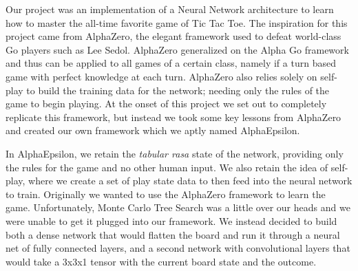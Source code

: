 

Our project was an implementation of a Neural Network architecture to learn how to master the all-time favorite game of Tic Tac Toe.
The inspiration for this project came from AlphaZero, the elegant framework used to defeat world-class Go players such as Lee Sedol.
AlphaZero generalized on the Alpha Go framework and thus can be applied to all games of a certain class, namely if a turn based game with perfect knowledge at each turn.
AlphaZero also relies solely on self-play to build the training data for the network;
needing only the rules of the game to begin playing.
At the onset of this project we set out to completely replicate this framework, but instead we took some key lessons from AlphaZero and created our own framework which we aptly named AlphaEpsilon.

In AlphaEpsilon, we retain the \textit{tabular rasa} state of the network, providing only the rules for the game and no other human input.
We also retain the idea of self-play, where we create a set of play state data to then feed into the neural network to train.
Originally we wanted to use the AlphaZero framework to learn the game.
Unfortunately, Monte Carlo Tree Search was a little over our heads and we were unable to get it plugged into our framework.
We instead decided to build both a dense network that would flatten the board and run it through a neural net of fully connected layers, and a second network with convolutional layers that would take a 3x3x1 tensor with the current board state and the outcome.
